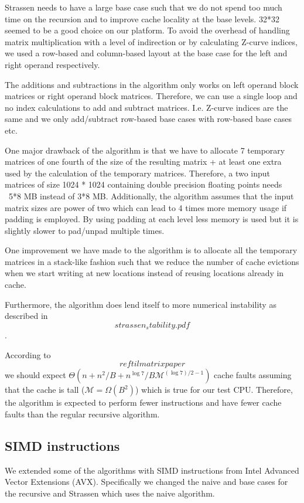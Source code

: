 Strassen needs to have a large base case such that we do not spend too much time on the recursion and to improve cache locality at the base levels. 32*32 seemed to be a good choice on our platform. To avoid the overhead of handling matrix multiplication with a level of indirection or by calculating Z-curve indices, we used a row-based and column-based layout at the base case for the left and right operand respectively.

The additions and subtractions in the algorithm only works on left operand block matrices or right operand block matrices. Therefore, we can use a single loop and no index calculations to add and subtract matrices. I.e. Z-curve indices are the same and we only add/subtract row-based base cases with row-based base cases etc.

One major drawback of the algorithm is that we have to allocate 7 temporary matrices of one fourth of the size of the resulting matrix + at least one extra used by the calculation of the temporary matrices. Therefore, a two input matrices of size 1024 * 1024 containing double precision floating points needs ~5*8 MB instead of 3*8 MB. Additionally, the algorithm assumes that the input matrix sizes are power of two which can lead to 4 times more memory usage if padding is employed. By using padding at each level less memory is used but it is slightly slower to pad/unpad multiple times.

One improvement we have made to the algorithm is to allocate all the temporary matrices in a stack-like fashion such that we reduce the number of cache evictions when we start writing at new locations instead of reusing locations already in cache.

Furthermore, the algorithm does lend itself to more numerical instability as described in \[strassen_stability.pdf\].

According to \[ ref til matrix paper \] we should expect $\Theta(n+n^2/B + n^{\log 7}/B\mathcal{M}^{(\log 7)/2-1})$ cache faults assuming that the cache is tall ($\mathcal{M} = \Omega(B^2)$) which is true for our test CPU. Therefore, the algorithm is expected to perform fewer instructions and have fewer cache faults than the regular recursive algorithm.

\subsection{SIMD instructions}

We extended some of the algorithms with SIMD instructions from Intel Advanced Vector Extensions (AVX). Specifically we changed the naive and base cases for the recursive and Strassen which uses the naive algorithm.

